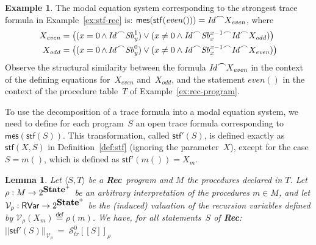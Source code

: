 \documentclass[10pt,a4paper]{amsart}
\newtheorem{lemma}[theorem]{Lemma}
\theoremstyle{definition}
\newtheorem{example}[theorem]{Example}
\newcommand{\defeq}{\stackrel{\mathsf{def}}{=}}
\newcommand{\denot}[1]{\left[\!\left[#1\right]\!\right]}
\newcommand{\trcdenoth}[1]{\mathcal{S}^0_{\mathit{tr}}\!\denot{#1}}
\newcommand{\logdenotV}[2]{\left|\!\left|#1\right|\!\right|_{#2}}
\newcommand{\chop}[0]{\raisebox{1ex}{$\frown$}}
\newcommand{\stfs}[1]{\mathsf{stf} (#1)}
\newcommand{\mes}[1]{\mathsf{mes} (#1)}
\newcommand{\stfsh}[1]{\mathsf{stf}' (#1)}
\newcommand{\stfh}[2]{\mathsf{stf}(#1, #2)}
\newcommand{\Rec}{\mbox{\bf Rec}}
\newcommand{\State}{\mbox{\bf State}}
\begin{document}
\begin{example}%
  The modal equation system corresponding to the strongest trace
  formula in Example~\ref{ex:stf-rec} is: $\mes{\stfs{\mathit{even}()}} = \mathit{Id}\chop X_{\mathit{even}}$, where
  \begin{align*} 
    X_{\mathit{even}}  = \bigl((x = 0\, \land\, & \mathit{Id} \chop \mathit{Sb}^{1}_{y}) \lor (x \neq 0 \land \mathit{Id} \chop \mathit{Sb}^{x-1}_{x} \chop \mathit{Id} \chop X_{\mathit{odd}})\bigr)\\
    X_{\mathit{odd}}  = \bigl((x = 0\, \land\, & \mathit{Id} \chop \mathit{Sb}^{0}_{y}) \lor (x \neq 0 \land \mathit{Id} \chop \mathit{Sb}^{x-1}_{x} \chop \mathit{Id} \chop X_{\mathit{even}})\bigr)
  \end{align*}
  Observe the structural similarity between the formula
  $\mathit{Id}\chop X_{\mathit{even}}$ in the context of the defining
  equations for~$X_{\mathit{even}}$ and~$X_{\mathit{odd}}$, and the
  statement $\mathit{even}()$ in the context of the procedure
  table~$T$ of Example~\ref{ex:rec-program}.
\end{example}

To use the decomposition of a trace formula into a modal equation
system, we need to define for each program~$S$ an open trace formula
corresponding to $\mes{\stfs{S}}$.  This transformation, called $\stfsh{S}$,
is defined exactly as $\stfh{X}{S}$ in Definition~\ref{def:stf}
(ignoring the parameter~$X$), except for the case $S=m()$, which is
defined as $\stfsh{m()} = X_m$.

\begin{lemma}
\label{lem:stfsh-characterisation}
  Let $\langle S,T\rangle$ be a \Rec\ program and $M$ the procedures
  declared in $T$. Let $\rho : M \rightarrow 2^{\State^+}$ be an
  arbitrary interpretation of the procedures $m\in M$, and let
  $\mathcal{V}_\rho : \mathsf{RVar} \rightarrow 2^{\State^+}$ be the
  (induced) valuation of the recursion variables defined by
  $\mathcal{V}_\rho (X_m) \defeq \rho (m)$.
  We have, for all statements~$S$ of \Rec:
  $
  \logdenotV{\stfsh{S}}{\mathcal{V}_\rho}  \>=\>  \trcdenoth{S}_\rho
  $
\end{lemma}
\end{document}
